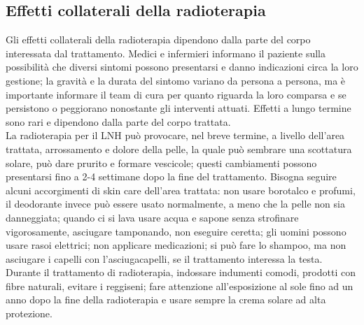 \subsection{Effetti collaterali della radioterapia}
Gli effetti collaterali della radioterapia dipendono dalla parte del corpo interessata dal trattamento. 
Medici e infermieri informano il paziente sulla possibilità che diversi sintomi possono presentarsi e danno indicazioni
circa la loro gestione; la gravità e la durata del sintomo variano da persona a persona, ma è importante informare 
il team di cura per quanto riguarda la loro comparsa e se persistono o peggiorano nonostante gli interventi attuati. 
Effetti a lungo termine sono rari e dipendono dalla parte del corpo trattata\cite{MACMILLAN}.\\

La radioterapia per il LNH può provocare, nel breve termine, a livello dell’area 
trattata, arrossamento e dolore della pelle, la quale può sembrare una scottatura solare, può dare prurito e 
formare vescicole; questi cambiamenti possono presentarsi fino a 2-4 settimane dopo la fine del trattamento\cite{UKRADIOTP}. 
Bisogna seguire alcuni accorgimenti di skin care dell’area trattata: 
non usare borotalco e profumi, il deodorante invece può essere usato normalmente, a meno che 
la pelle non sia danneggiata; quando ci si lava usare acqua e sapone senza strofinare vigorosamente, 
asciugare tamponando, non eseguire ceretta; gli uomini possono usare rasoi elettrici; non applicare medicazioni; 
si può fare lo shampoo, ma non asciugare i capelli con l’asciugacapelli, se il trattamento interessa la testa.\\ 
Durante il trattamento di radioterapia, indossare indumenti comodi, prodotti con fibre naturali, evitare i reggiseni; 
fare attenzione all’esposizione al sole fino ad un anno dopo la fine della radioterapia e usare sempre la crema 
solare ad alta protezione\cite{UKRADIOTP}.\\

